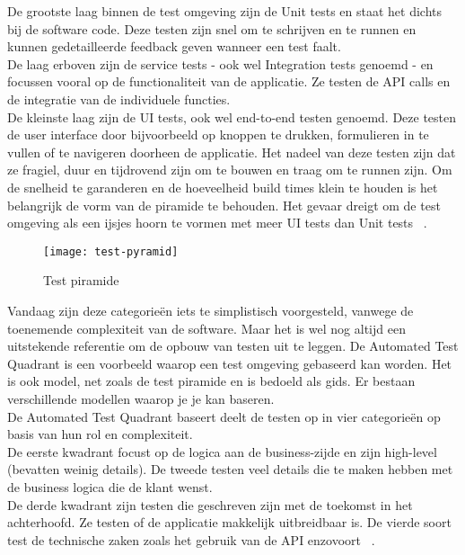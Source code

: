         De grootste laag binnen de test omgeving zijn de Unit tests en staat het dichts bij de software code. Deze testen zijn snel om te schrijven en te runnen en kunnen gedetailleerde feedback geven wanneer een test faalt.\\
        De laag erboven zijn de service tests - ook wel Integration tests genoemd - en focussen vooral op de functionaliteit van de applicatie. Ze testen de API calls en de integratie van de individuele functies.\\
        De kleinste laag zijn de UI tests, ook wel end-to-end testen genoemd. Deze testen de user interface door bijvoorbeeld op knoppen te drukken, formulieren in te vullen of te navigeren doorheen de applicatie. Het nadeel van deze testen zijn dat ze fragiel, duur en tijdrovend zijn om te bouwen en traag om te runnen zijn.
        Om de snelheid te garanderen en de hoeveelheid build times klein te houden is het belangrijk de vorm van de piramide te behouden. Het gevaar dreigt om de test omgeving als een ijsjes hoorn te vormen met meer UI tests dan Unit tests ~\autocite{Fowler2012}.
        \begin{figure}	
            \texttt{[image: test-pyramid]}
            \caption{Test piramide ~\autocite{Vocke2018}} \label{img-test-pyramid}
        \end{figure}
    
        Vandaag zijn deze categorieën iets te simplistisch voorgesteld, vanwege de toenemende complexiteit van de software. Maar het is wel nog altijd een uitstekende referentie om de opbouw van testen uit te leggen.
        De Automated Test Quadrant is een voorbeeld waarop een test omgeving gebaseerd kan worden. Het is ook model, net zoals de test piramide en is bedoeld als gids. Er bestaan verschillende modellen waarop je je kan baseren.\\
        De Automated Test Quadrant baseert deelt de testen op in vier categorieën op basis van hun rol en complexiteit.\\
        De eerste kwadrant focust op de logica aan de business-zijde en zijn high-level (bevatten weinig details). De tweede testen veel details die te maken hebben met de business logica die de klant wenst.\\
        De derde kwadrant zijn testen die geschreven zijn met de toekomst in het achterhoofd. Ze testen of de applicatie makkelijk uitbreidbaar is. De vierde soort test de technische zaken zoals het gebruik van de API enzovoort ~\autocite{Smart2017}.